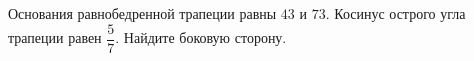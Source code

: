 \begin{ex}
	\begin{condition}
		Основания равнобедренной трапеции равны \( 43  \) и \( 73 \). Косинус острого угла трапеции равен \( \dfrac{5}{7} \).  Найдите боковую сторону.
	\end{condition}
\end{ex}
